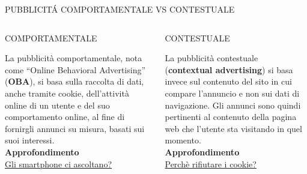 \documentclass[aspectratio=1610]{beamer}
\begin{document}
\begin{frame}{PUBBLICIT\'A COMPORTAMENTALE VS CONTESTUALE}
    \begin{columns}
            \begin{alertblock}{COMPORTAMENTALE}
                \begin{minipage}{0.96\linewidth}
                    \justifying
                    La pubblicità comportamentale, nota come ``Online Behavioral Advertising'' (\textbf{OBA}), 
                    si basa sulla raccolta di dati, anche tramite cookie, dell’attività online di 
                    un utente e del suo comportamento online, al fine di fornirgli annunci su misura, 
                    basati sui suoi interessi.\\
                    \bigskip
                    \tiny{\textbf{Approfondimento}}\\
                    \tiny{\href{https://attivissimo.me/2024/09/06/podcast-rsi-gli-smartphone-ci-ascoltano-no-ma}{Gli smartphone ci ascoltano?}}
                \end{minipage}
            \end{alertblock}
            \begin{alertblock}{CONTESTUALE}
                \begin{minipage}{0.96\linewidth}
                    \justifying
                    La pubblicità contestuale (\textbf{contextual advertising}) si basa invece sul contenuto 
                    del sito in cui compare l’annuncio e non sui dati di navigazione. Gli annunci sono 
                    quindi pertinenti al contenuto della pagina web che l’utente sta visitando in quel 
                    momento.\\ 
                    \bigskip
                    \tiny{\textbf{Approfondimento}}\\
                    \tiny{\href{https://www.geopop.it/come-funzionano-le-pubblicita-personalizzate-online-il-ruolo-dei-cookie-e-la-nostra-privacy/}{Perchè rifiutare i cookie?}}
                \end{minipage}
            \end{alertblock}
    \end{columns}
\end{frame}
\end{document}
